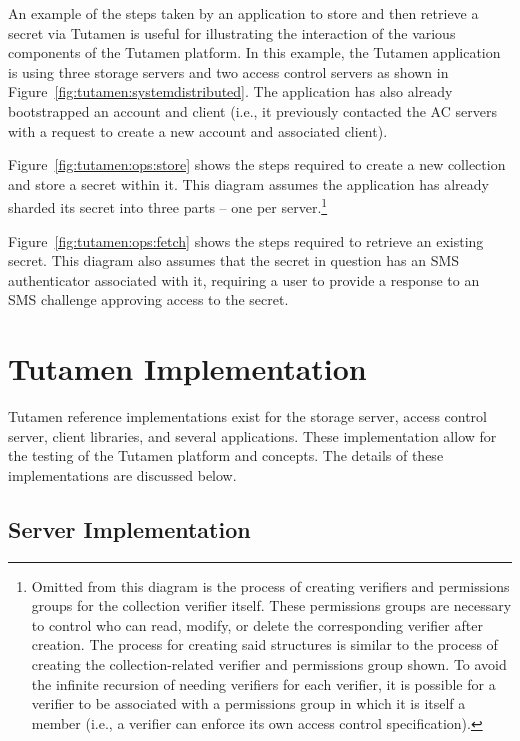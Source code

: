 An example of the steps taken by an application to store and then
retrieve a secret via Tutamen is useful for illustrating the
interaction of the various components of the Tutamen platform. In this
example, the Tutamen application is using three storage servers and
two access control servers as shown in
Figure~\ref{fig:tutamen:systemdistributed}. The application has also
already bootstrapped an account and client (i.e., it previously
contacted the AC servers with a request to create a new account and
associated client).

Figure~\ref{fig:tutamen:ops:store} shows the steps required to create
a new collection and store a secret within it. This diagram assumes
the application has already sharded its secret into three parts -- one
per server.\footnote{Omitted from this diagram is the process of
  creating verifiers and permissions groups for the collection
  verifier itself. These permissions groups are necessary to control
  who can read, modify, or delete the corresponding verifier after
  creation. The process for creating said structures is similar to the
  process of creating the collection-related verifier and permissions
  group shown. To avoid the infinite recursion of needing verifiers
  for each verifier, it is possible for a verifier to be associated
  with a permissions group in which it is itself a member (i.e., a
  verifier can enforce its own access control specification).}

Figure~\ref{fig:tutamen:ops:fetch} shows the steps required to
retrieve an existing secret. This diagram also assumes that the secret
in question has an SMS authenticator associated with it, requiring a
user to provide a response to an SMS challenge approving access to the
secret.

\section{Tutamen Implementation}
\label{chap:tutamen:imp}

Tutamen reference implementations exist for the storage server, access
control server, client libraries, and several applications. These
implementation allow for the testing of the Tutamen platform and
concepts. The details of these implementations are discussed below.

\subsection{Server Implementation}
\label{chap:tutamen:imp:server}

